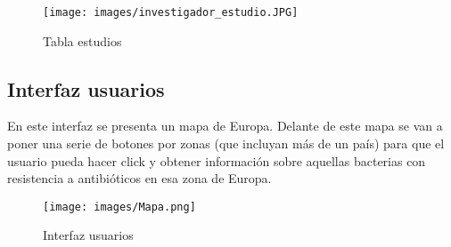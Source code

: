 \documentclass[../main.tex]{subfiles}
\begin{document}
\begin{figure}[ht]
    \centering
    \texttt{[image: images/investigador\_estudio.JPG]}
    \caption{Tabla estudios}
    \label{invEst}
\end{figure}

\newpage

\subsection{Interfaz usuarios}

En este interfaz se presenta un mapa de Europa. Delante de este mapa se van a poner una serie de botones por zonas (que incluyan más de un país) para que el usuario pueda hacer click y obtener información sobre aquellas bacterias con resistencia a antibióticos en esa zona de Europa.

\begin{figure}[ht]
    \centering
    \texttt{[image: images/Mapa.png]}
    \caption{Interfaz usuarios}
    \label{Mapalabel}
\end{figure}
\end{document}
